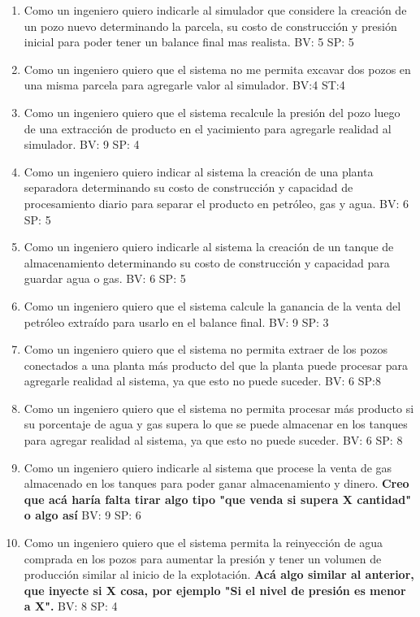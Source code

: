 \begin{enumerate}
  \item Como un ingeniero quiero indicarle al simulador que considere la creación de un pozo nuevo determinando la parcela, su costo de construcción y presión inicial para poder tener un balance final mas realista. BV: 5 SP: 5
  \item Como un ingeniero quiero que el sistema no me permita excavar dos pozos en una misma parcela para agregarle valor al simulador. BV:4 ST:4
  \item Como un ingeniero quiero que el sistema recalcule la presión del pozo luego de una extracción de producto en el yacimiento para agregarle realidad al simulador. BV: 9 SP: 4 
  \item Como un ingeniero quiero indicar al sistema la creación de una planta separadora determinando su costo de construcción y capacidad de procesamiento diario para separar el producto en petróleo, gas y agua. BV: 6 SP: 5 
  \item Como un ingeniero quiero indicarle al sistema la creación de un tanque de almacenamiento determinando su costo de construcción y capacidad para guardar agua o gas. BV: 6 SP: 5 
  \item Como un ingeniero quiero que el sistema calcule la ganancia de la venta del petróleo extraído para usarlo en el balance final. BV: 9 SP: 3
  \item Como un ingeniero quiero que el sistema no permita extraer de los pozos conectados a una planta más producto del que la planta puede procesar para agregarle realidad al sistema, ya que esto no puede suceder. BV: 6 SP:8 
  \item Como un ingeniero quiero que el sistema no permita procesar más producto si su porcentaje de agua y gas supera lo que se puede almacenar en los tanques para agregar realidad al sistema, ya que esto no puede suceder. BV: 6 SP: 8 
  \item Como un ingeniero quiero indicarle al sistema que procese la venta de gas almacenado en los tanques para poder ganar almacenamiento y dinero. \textbf{Creo que acá haría falta tirar algo tipo "que venda si supera X cantidad" o algo así} BV: 9 SP: 6
  \item Como un ingeniero quiero que el sistema permita la reinyección de agua comprada en los pozos para aumentar la presión y tener un volumen de producción similar al inicio de la explotación. \textbf{Acá algo similar al anterior, que inyecte si X cosa, por ejemplo "Si el nivel de presión es menor a X".} BV: 8 SP: 4

\end{enumerate}
